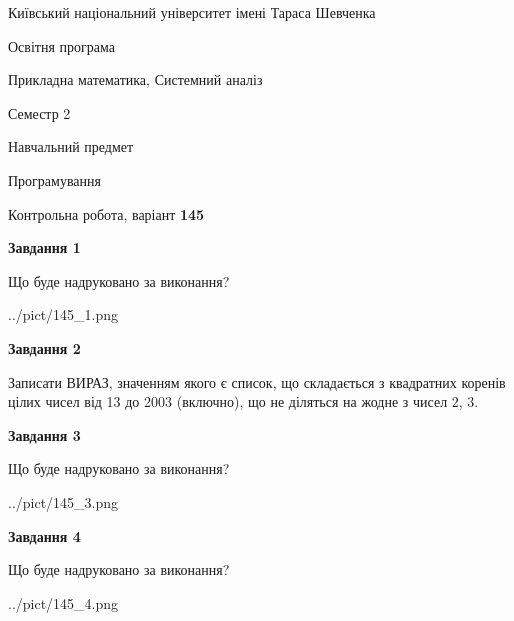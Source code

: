 \documentclass[12pt, ukrainian]{article}
\begin{document}
{{\begin {small}\par
{ \center  Київський національний університет імені Тараса Шевченка \par}
{\parbox {5 cm}{Освітня програма \hfill}{\parbox {8 cm}{Прикладна математика, Системний аналіз \hfill}}\parbox {5 cm}{\hfill Семестр 2}}\par
{\parbox {5 cm} {Навчальний предмет \hfill}\parbox {7 cm}{Програмування \hfill}\parbox {6cm}{\hfill}\par}\vspace{-7pt} \end{small}}{\center Контрольна робота, варіант  \No \textbf
{ 145 }\par}}
{
\begin {large}
{\begin {center}\textbf{Завдання 1}\end {center}}\par
Що буде надруковано за виконання?\par\par
\begin{center}
	{../pict/145_1.png}
\end{center}
\newpage

{\begin {center}\textbf{Завдання 2}\end {center}}\par

Записати ВИРАЗ, значенням якого є список, що складається з квадратних коренів цілих чисел від 13 до 2003 (включно), що не діляться на жодне з чисел 2, 3.\par
\newpage

{\begin {center}\textbf{Завдання 3}\end {center}}\par
Що буде надруковано за виконання?
\begin{center}
	{../pict/145_3.png}
\end{center}
\newpage

{\begin {center}\textbf{Завдання 4}\end {center}}\par
Що буде надруковано за виконання?\par
\begin{center}
	{../pict/145_4.png}
\end{center}
\newpage


\end{large}}
\end{document}
